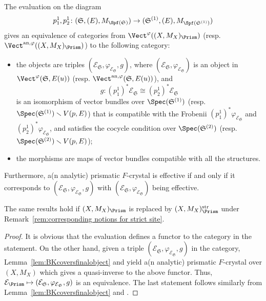 \begin{lem} \label{lem:descentlemmavectorbundleversion}
The evaluation on the diagram 
\[
p^1_1, p^1_2\colon (\mathfrak{S},(E), M_{\Spf(\mathfrak{S})}) \to (\mathfrak{S}^{(1)}, (E), M_{\Spf(\mathfrak{S}^{(1)})})
\] gives an equivalence of categories from $\Vect^{\varphi}((X,M_X)_\Prism)$ (resp. $\Vect^{\mathrm{an},\varphi}((X,M_X)_\Prism)$) to the following category: 
\begin{itemize}
    \item the objects are triples $(\mathcal{E}_{\mathfrak{S}},\varphi_{\mathcal{E}_{\mathfrak{S}}}, g)$, where $(\mathcal{E}_{\mathfrak{S}},\varphi_{\mathcal{E}_{\mathfrak{S}}})$ is an object in $\Vect^{\varphi}(\mathfrak{S},E(u))$ (resp. $\Vect^{\mathrm{an},\varphi}(\mathfrak{S},E(u))$), and 
\[
g\colon (p^1_1)^\ast \mathcal{E}_{\mathfrak{S}} \cong (p^1_2)^\ast\mathcal{E}_{\mathfrak{S}}
\]
is an isomorphism of vector bundles over $\Spec(\mathfrak{S}^{(1)})$ (resp. $\Spec(\mathfrak{S}^{(1)})\smallsetminus V(p,E)$) that is compatible with the Frobenii $(p^1_1)^\ast\varphi_{\mathcal{E}_{\mathfrak{S}}}$ and $(p^1_2)^\ast\varphi_{\mathcal{E}_{\mathfrak{S}}}$, and satisfies the cocycle condition over $\Spec(\mathfrak{S}^{(2)})$ (resp. $\Spec(\mathfrak{S}^{(2)})\smallsetminus V(p,E)$);
\item the morphisms are maps of vector bundles compatible with all the structures.
\end{itemize}

Furthermore, a(n analytic) prismatic $F$-crystal is effective if and only if it corresponds to $(\mathcal{E}_{\mathfrak{S}},\varphi_{\mathcal{E}_{\mathfrak{S}}},g)$ with $(\mathcal{E}_{\mathfrak{S}},\varphi_{\mathcal{E}_{\mathfrak{S}}})$ being effective. 

The same results hold if $(X,M_X)_\Prism$ is replaced by $(X,M_X)_\Prism^{\mathrm{str}}$ under Remark~\ref{rem:corresponding notions for strict site}.
\end{lem}

\begin{proof}
It is obvious that the evaluation  defines a functor to the category in the statement. On the other hand, given a triple $(\mathcal{E}_{\mathfrak{S}},\varphi_{\mathcal{E}_{\mathfrak{S}}}, g)$ in the category, Lemma~\ref{lem:BKcoversfinalobject} and \cite[Thm.~7.8]{mathew-descent} yield a(n analytic) prismatic $F$-crystal over $(X,M_X)$ which gives a quasi-inverse to the above functor. Thus, $\mathcal{E}_\Prism \mapsto (\mathcal{E}_{\mathfrak{S}},\varphi_{\mathcal{E}_{\mathfrak{S}}}, g)$ is an equivalence. The last statement follows similarly from Lemma~\ref{lem:BKcoversfinalobject} and \cite[Thm.~7.8]{mathew-descent}. 
\end{proof}

